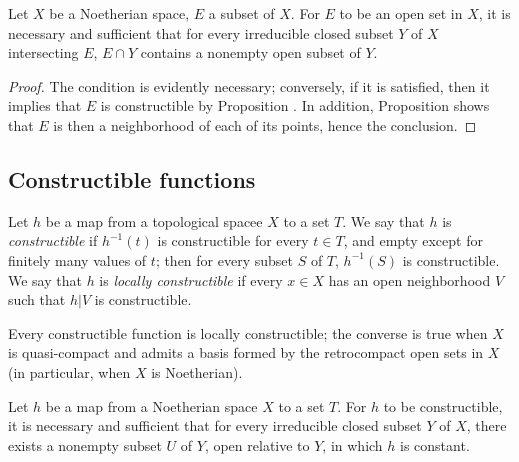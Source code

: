 \begin{corollary}[9.2.6]
\label{0.9.2.6}
Let $X$ be a Noetherian space, $E$ a subset of $X$.
For $E$ to be an open set in $X$, it is necessary and sufficient that for every irreducible closed subset $Y$ of $X$ intersecting $E$, $E\cap Y$ contains a nonempty open subset of $Y$.
\end{corollary}

\begin{proof}
The condition is evidently necessary; conversely, if it is satisfied, then it implies that $E$ is constructible by Proposition .
In addition, Proposition  shows that $E$ is then a neighborhood of each of its points, hence the conclusion.
\end{proof}

\subsection{Constructible functions}
\label{subsection:0.9.3}

\begin{definition}[9.3.1]
\label{0.9.3.1}
Let $h$ be a map from a topological spacee $X$ to a set $T$.
We say that $h$ is \emph{constructible} if $h^{-1}(t)$ is constructible for every $t\in T$, and empty except for finitely many values of $t$; then for every subset $S$ of $T$, $h^{-1}(S)$ is constructible.
We say that $h$ is \emph{locally constructible} if every $x\in X$ has an open neighborhood $V$ such that $h|V$ is constructible.
\end{definition}

Every constructible function is locally constructible; the converse is true when $X$ is quasi-compact and admits a basis formed by the retrocompact open sets in $X$ (in particular, when $X$ is Noetherian).

\begin{proposition}[9.3.2]
\label{0.9.3.2}
Let $h$ be a map from a Noetherian space $X$ to a set $T$.
For $h$ to be constructible, it is necessary and sufficient that for every irreducible closed subset $Y$ of $X$, there exists a nonempty subset $U$ of $Y$, open relative to $Y$, in which $h$ is constant.
\end{proposition}

